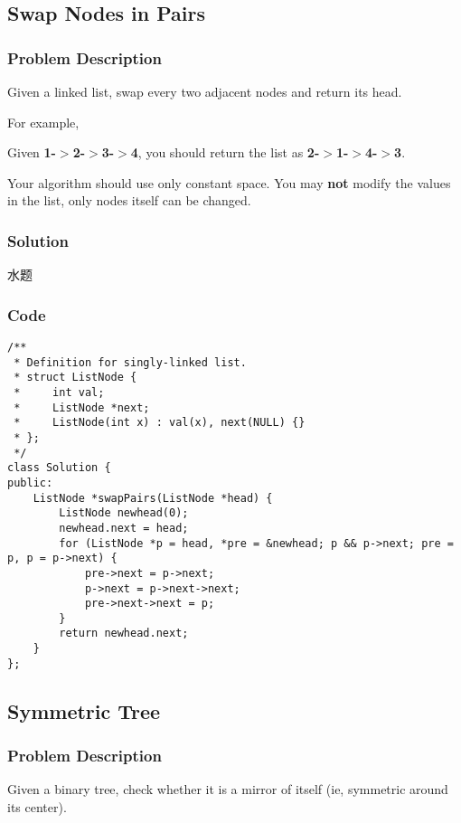 \documentclass[courier]{article}
\begin{document}
\begin{CJK*}{UTF8}{gkai}
\subsection{ Swap Nodes in Pairs }

\subsubsection*{Problem Description}
Given a linked list, swap every two adjacent nodes and return its head.

For example,


Given \textbf{1-$>$2-$>$3-$>$4}, you should return the list as \textbf{2-$>$1-$>$4-$>$3}.

Your algorithm should use only constant space. You may \textbf{not} modify the values in the list, only nodes itself can be changed.



\subsubsection*{Solution}
水题

\subsubsection*{Code}
\begin{lstlisting}
/**
 * Definition for singly-linked list.
 * struct ListNode {
 *     int val;
 *     ListNode *next;
 *     ListNode(int x) : val(x), next(NULL) {}
 * };
 */
class Solution {
public:
    ListNode *swapPairs(ListNode *head) {
        ListNode newhead(0);
        newhead.next = head;
        for (ListNode *p = head, *pre = &newhead; p && p->next; pre = p, p = p->next) {
            pre->next = p->next;
            p->next = p->next->next;
            pre->next->next = p;
        }
        return newhead.next;
    }
}; 
\end{lstlisting}


\subsection{ Symmetric Tree }

\subsubsection*{Problem Description}
Given a binary tree, check whether it is a mirror of itself (ie, symmetric around its center).


\end{CJK*}
\end{document}
